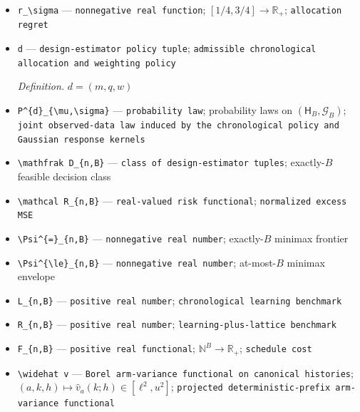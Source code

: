 \documentclass{article}
\begin{document}
\begin{itemize}
  \item \texttt{r\_\allowbreak{}\textbackslash{}\allowbreak{}sigma} --- \texttt{nonnegative real function}; \([1/4,3/4]\to\mathbb R_+\); \texttt{allocation regret}
  \item \texttt{d} --- \texttt{design-\allowbreak{}estimator policy tuple}; \texttt{admissible chronological allocation and weighting policy}
  \par\smallskip\noindent\emph{Definition.} \(d=(m,q,w)\)
  \item \texttt{P\textasciicircum{}\{d\}\allowbreak{}\_\allowbreak{}\{\textbackslash{}\allowbreak{}mu,\allowbreak{}\textbackslash{}\allowbreak{}sigma\}\allowbreak{}} --- \texttt{probability law}; probability laws on \((\mathsf H_B,\mathcal G_B)\); \texttt{joint observed-\allowbreak{}data law induced by the chronological policy and Gaussian response kernels}
  \item \texttt{\textbackslash{}\allowbreak{}mathfrak D\_\allowbreak{}\{n,\allowbreak{}B\}\allowbreak{}} --- \texttt{class of design-\allowbreak{}estimator tuples}; exactly-\(B\) feasible decision class
  \item \texttt{\textbackslash{}\allowbreak{}mathcal R\_\allowbreak{}\{n,\allowbreak{}B\}\allowbreak{}} --- \texttt{real-\allowbreak{}valued risk functional}; \texttt{normalized excess MSE}
  \item \texttt{\textbackslash{}\allowbreak{}Psi\textasciicircum{}\{=\allowbreak{}\}\allowbreak{}\_\allowbreak{}\{n,\allowbreak{}B\}\allowbreak{}} --- \texttt{nonnegative real number}; exactly-\(B\) minimax frontier
  \item \texttt{\textbackslash{}\allowbreak{}Psi\textasciicircum{}\{\textbackslash{}\allowbreak{}le\}\allowbreak{}\_\allowbreak{}\{n,\allowbreak{}B\}\allowbreak{}} --- \texttt{nonnegative real number}; at-most-\(B\) minimax envelope
  \item \texttt{L\_\allowbreak{}\{n,\allowbreak{}B\}\allowbreak{}} --- \texttt{positive real number}; \texttt{chronological learning benchmark}
  \item \texttt{R\_\allowbreak{}\{n,\allowbreak{}B\}\allowbreak{}} --- \texttt{positive real number}; \texttt{learning-\allowbreak{}plus-\allowbreak{}lattice benchmark}
  \item \texttt{F\_\allowbreak{}\{n,\allowbreak{}B\}\allowbreak{}} --- \texttt{positive real functional}; \(\mathbb N^B\to\mathbb R_+\); \texttt{schedule cost}
  \item \texttt{\textbackslash{}\allowbreak{}widehat v} --- \texttt{Borel arm-\allowbreak{}variance functional on canonical histories}; \((a,k,h)\mapsto\widehat v_a(k;h)\in[\ell^2,u^2]\); \texttt{projected deterministic-\allowbreak{}prefix arm-\allowbreak{}variance functional}

\end{itemize}
\end{document}
